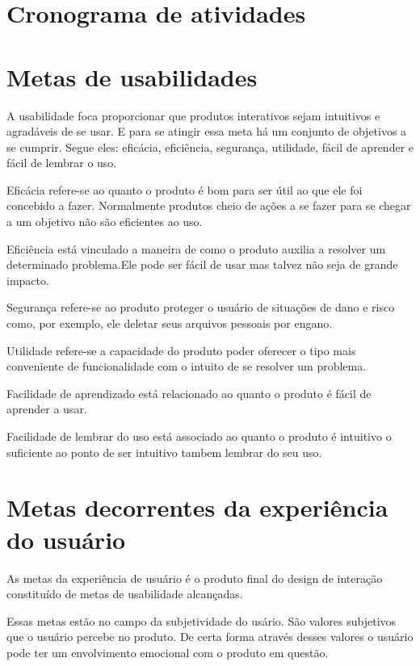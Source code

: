 \section{Cronograma de atividades} %
\label{sec:cronograma_de_atividades}




\section{Metas de usabilidades} %
\label{sec:metas_de_usabilidades}
	A usabilidade foca proporcionar que produtos interativos sejam intuitivos e agradáveis de se usar. E para se atingir essa meta há um conjunto de objetivos a se cumprir. Segue eles: eficácia, eficiência, segurança, utilidade, fácil de aprender e fácil de lembrar o uso.

	Eficácia refere-se ao quanto o produto é bom para ser útil ao que ele foi concebido a fazer. Normalmente produtos cheio de ações a se fazer para se chegar a um objetivo não são eficientes ao uso.

	Eficiência está vinculado a maneira de como o produto auxilia a resolver um determinado problema.Ele pode ser fácil de usar mas talvez não seja de grande impacto.

	Segurança refere-se ao produto proteger o usuário de situações de dano e risco como, por exemplo, ele deletar seus arquivos pessoais por engano.

	Utilidade refere-se a capacidade do produto poder oferecer o tipo mais conveniente de funcionalidade com o intuito de se resolver um problema. 

	Facilidade de aprendizado está relacionado ao quanto o produto é fácil de aprender a usar.

	Facilidade de lembrar do uso está associado ao quanto o produto é intuitivo o suficiente ao ponto de ser intuitivo tambem lembrar do seu uso.

\section{Metas decorrentes da experiência do usuário} %
\label{sub:metas_decorrentes_da_experi_ncia_do_usu_rio}
	As metas da experiência de usuário é o produto final do design de interação constituído de metas de usabilidade alcançadas. 

	Essas metas estão no campo da subjetividade do usário. São valores subjetivos que o usuário percebe no produto. De certa forma através desses valores o usuário pode ter um envolvimento emocional com o produto em questão. 

